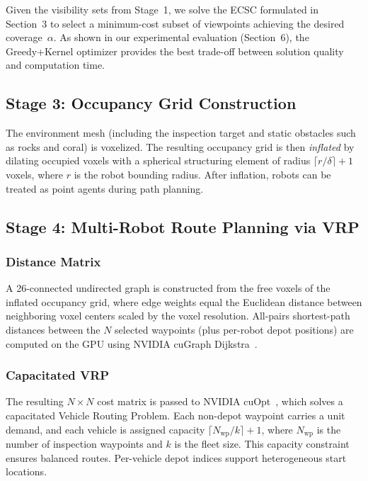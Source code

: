\documentclass[letterpaper, 10 pt, conference]{ieeeconf}  %
\begin{document}
Given the visibility sets from Stage~1, we solve the ECSC formulated in Section~3 to select a minimum-cost subset of viewpoints achieving the desired coverage~$\alpha$. As shown in our experimental evaluation (Section~6), the Greedy+Kernel optimizer provides the best trade-off between solution quality and computation time.

\subsection{Stage 3: Occupancy Grid Construction}

The environment mesh (including the inspection target and static obstacles such as rocks and coral) is voxelized. The resulting occupancy grid is then \emph{inflated} by dilating occupied voxels with a spherical structuring element of radius $\lceil r/\delta \rceil + 1$ voxels, where $r$ is the robot bounding radius. After inflation, robots can be treated as point agents during path planning.

\subsection{Stage 4: Multi-Robot Route Planning via VRP}

\subsubsection{Distance Matrix}
A 26-connected undirected graph is constructed from the free voxels of the inflated occupancy grid, where edge weights equal the Euclidean distance between neighboring voxel centers scaled by the voxel resolution. All-pairs shortest-path distances between the $N$ selected waypoints (plus per-robot depot positions) are computed on the GPU using NVIDIA cuGraph Dijkstra~\cite{cugraph}.

\subsubsection{Capacitated VRP}
The resulting $N \times N$ cost matrix is passed to NVIDIA cuOpt~\cite{cuopt}, which solves a capacitated Vehicle Routing Problem. Each non-depot waypoint carries a unit demand, and each vehicle is assigned capacity $\lceil N_{\text{wp}} / k \rceil + 1$, where $N_{\text{wp}}$ is the number of inspection waypoints and $k$ is the fleet size. This capacity constraint ensures balanced routes. Per-vehicle depot indices support heterogeneous start locations.
\end{document}
